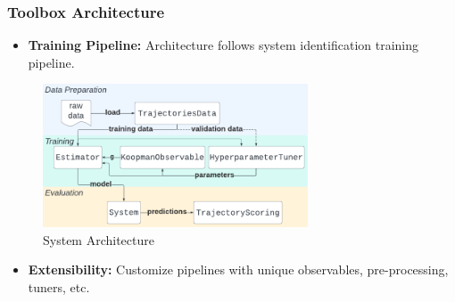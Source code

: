 \documentclass[shortpres,aspectratio=43]{beamer}
\begin{document}
\begin{frame}
\frametitle{Toolbox Architecture}
\begin{itemize}
    \item<1-> \textbf{Training Pipeline:} Architecture follows system identification training pipeline.
\end{itemize}
\begin{figure}
  \centering
  \includegraphics[width=0.7\textwidth]{./img/autokoopman_objects.pdf} %
  \caption{System Architecture}
\end{figure}
\begin{itemize}
    \item<2-> \textbf{Extensibility:} Customize pipelines with unique observables, pre-processing, tuners, etc.
\end{itemize}
\end{frame}
\end{document}
